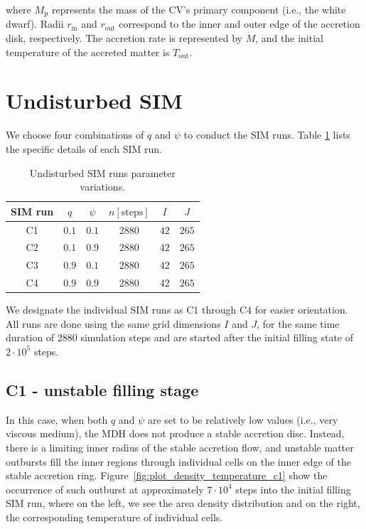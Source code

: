     where $M_{\mathrm{p}}$ represents the mass of the CV's primary component (i.e., the white dwarf). Radii $r_{\mathrm{in}}$ and $r_{\mathrm{out}}$ correspond to the inner and outer edge of the accretion disk, respectively. The accretion rate is represented by $\dot{M}$, and the initial temperature of the accreted matter is $T_{\mathrm{out}}$.

\section{Undisturbed SIM}
    We choose four combinations of $q$ and $\psi$ to conduct the SIM runs. Table \ref{tab:table_simultation_cases_undisturbed} lists the specific details of each SIM run.

    \begin{table}[ht]
    \centering
    \begin{tabular*}{\columnwidth}{@{\extracolsep{\fill}}cccccc}
    SIM run & $q$ & $\psi$ & $n [\mathrm{steps}]$ & $I$ & $J$ \\ 
    \hline\hline
        C1 & $0.1$ & $0.1$ & $2880$ & $42$ & $265$ \\
        C2 & $0.1$ & $0.9$ & $2880$ & $42$ & $265$ \\
        C3 & $0.9$ & $0.1$ & $2880$ & $42$ & $265$ \\
        C4 & $0.9$ & $0.9$ & $2880$ & $42$ & $265$ \\
    \hline
    \end{tabular*}
    \caption{Undisturbed SIM runs parameter variations.}
    \label{tab:table_simultation_cases_undisturbed}
    \end{table}

    We designate the individual SIM runs as C1 through C4 for easier orientation. All runs are done using the same grid dimensions $I$ and $J$, for the same time duration of $2880$ simulation steps and are started after the initial filling state of $2 \cdot 10^5$ steps. 

\subsection{C1 - unstable filling stage}
    In this case, when both $q$ and $\psi$ are set to be relatively low values (i.e., very viscous medium), the MDH does not produce a stable accretion disc. Instead, there is a limiting inner radius of the stable accretion flow, and unstable matter outbursts fill the inner regions through individual cells on the inner edge of the stable accretion ring. 
    Figure~\ref{fig:plot_density_temperature_c1} show the occurrence of such outburst at approximately $7 \cdot 10^4$ steps into the initial filling SIM run, where on the left, we see the area density distribution and on the right, the corresponding temperature of individual cells.

